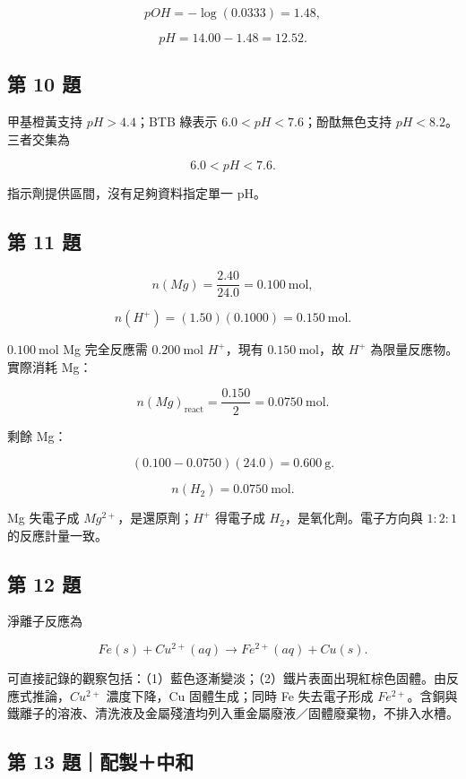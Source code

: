 \documentclass[11pt,a4paper]{article}
\begin{document}
\[
pOH=-\log(0.0333)=1.48,
\]

\[
pH=14.00-1.48=12.52.
\]

\subsection{第 10 題}\label{ux7b2c-10-ux984c}

甲基橙黃支持 \(pH>4.4\)；BTB 綠表示 \(6.0<pH<7.6\)；酚酞無色支持 \(pH<8.2\)。三者交集為

\[
6.0<pH<7.6.
\]

指示劑提供區間，沒有足夠資料指定單一 pH。

\subsection{第 11 題}\label{ux7b2c-11-ux984c}

\[
n(Mg)=\frac{2.40}{24.0}=0.100\ \mathrm{mol},
\]

\[
n(H^+)=(1.50)(0.1000)=0.150\ \mathrm{mol}.
\]

\(0.100\ \mathrm{mol}\) Mg 完全反應需 \(0.200\ \mathrm{mol}\) \(H^+\)，現有 \(0.150\ \mathrm{mol}\)，故 \(H^+\) 為限量反應物。實際消耗 Mg：

\[
n(Mg)_{\mathrm{react}}=\frac{0.150}{2}=0.0750\ \mathrm{mol}.
\]

剩餘 Mg：

\[
(0.100-0.0750)(24.0)=0.600\ \mathrm g.
\]

\[
n(H_2)=0.0750\ \mathrm{mol}.
\]

Mg 失電子成 \(Mg^{2+}\)，是還原劑；\(H^+\) 得電子成 \(H_2\)，是氧化劑。電子方向與 \(1:2:1\) 的反應計量一致。

\subsection{第 12 題}\label{ux7b2c-12-ux984c}

淨離子反應為

\[
Fe(s)+Cu^{2+}(aq)\rightarrow Fe^{2+}(aq)+Cu(s).
\]

可直接記錄的觀察包括：（1）藍色逐漸變淡；（2）鐵片表面出現紅棕色固體。由反應式推論，\(Cu^{2+}\) 濃度下降，Cu 固體生成；同時 Fe 失去電子形成 \(Fe^{2+}\)。含銅與鐵離子的溶液、清洗液及金屬殘渣均列入重金屬廢液／固體廢棄物，不排入水槽。

\subsection{第 13 題｜配製＋中和}\label{ux7b2c-13-ux984cux914dux88fdux4e2dux548c}
\end{document}
